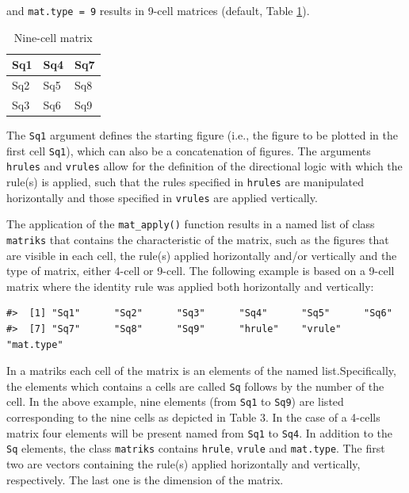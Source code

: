 and \texttt{mat.type\ =\ 9} results in 9-cell matrices (default, Table \ref{tab:nineCell-static}).

\begin{table}

\caption{\label{tab:nineCell-static}Nine-cell matrix}
\centering
\begin{tabular}[t]{l|l|l}
\hline
Sq1 & Sq4 & Sq7\\
\hline
Sq2 & Sq5 & Sq8\\
\hline
Sq3 & Sq6 & Sq9\\
\hline
\end{tabular}
\end{table}

The \texttt{Sq1} argument defines the starting figure (i.e., the figure to be plotted in the first cell \texttt{Sq1}), which can also be a concatenation of figures.
The arguments \texttt{hrules} and \texttt{vrules} allow for the definition of the directional logic with which the rule(s) is applied, such that the rules specified in \texttt{hrules} are manipulated horizontally and those specified in \texttt{vrules} are applied vertically.

The application of the \texttt{mat\_apply()} function results in a named list of class \texttt{matriks} that contains the characteristic of the matrix, such as the figures that are visible in each cell, the rule(s) applied horizontally and/or vertically and the type of matrix, either 4-cell or 9-cell.
The following example is based on a 9-cell matrix where the identity rule was applied both horizontally and vertically:

\begin{verbatim}
#>  [1] "Sq1"      "Sq2"      "Sq3"      "Sq4"      "Sq5"      "Sq6"     
#>  [7] "Sq7"      "Sq8"      "Sq9"      "hrule"    "vrule"    "mat.type"
\end{verbatim}

In a matriks each cell of the matrix is an elements of the named list.Specifically, the elements which contains a cells are called \texttt{Sq} follows by the number of the cell.
In the above example, nine elements (from \texttt{Sq1} to \texttt{Sq9}) are listed corresponding to the nine cells as depicted in Table 3.
In the case of a 4-cells matrix four elements will be present named from \texttt{Sq1} to \texttt{Sq4}.
In addition to the \texttt{Sq} elements, the class \texttt{matriks} contains \texttt{hrule}, \texttt{vrule} and \texttt{mat.type}.
The first two are vectors containing the rule(s) applied horizontally and vertically, respectively.
The last one is the dimension of the matrix.

